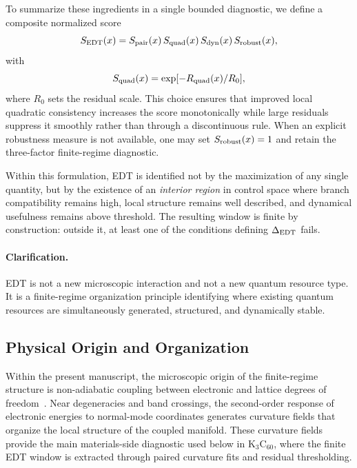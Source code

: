 ﻿\documentclass[aps,prx,reprint,superscriptaddress,longbibliography,floatfix]{revtex4-2}
\begin{document}
To summarize these ingredients in a single bounded diagnostic, we define a composite normalized score
\begin{equation}
S_{\rm EDT}(x) = S_{\rm pair}(x)\,S_{\rm quad}(x)\,S_{\rm dyn}(x)\,S_{\rm robust}(x),
\end{equation}
with
\begin{equation}
S_{\rm quad}(x) = \exp[-R_{\rm quad}(x)/R_0],
\end{equation}
where $R_0$ sets the residual scale. This choice ensures that improved local quadratic consistency increases the score monotonically while large residuals suppress it smoothly rather than through a discontinuous rule. When an explicit robustness measure is not available, one may set $S_{\rm robust}(x)=1$ and retain the three-factor finite-regime diagnostic.

Within this formulation, EDT is identified not by the maximization of any single quantity, but by the existence of an \emph{interior region} in control space where branch compatibility remains high, local structure remains well described, and dynamical usefulness remains above threshold. The resulting window is finite by construction: outside it, at least one of the conditions defining $\Delta_{\rm EDT}$ fails.

\paragraph*{Clarification.}

EDT is not a new microscopic interaction and not a new quantum resource type. It is a finite-regime organization principle identifying where existing quantum resources are simultaneously generated, structured, and dynamically stable.

\subsection{Physical Origin and Organization}

Within the present manuscript, the microscopic origin of the finite-regime structure is non-adiabatic coupling between electronic and lattice degrees of freedom~\cite{Mead1979,Yarkony1996,Giustino2017}. Near degeneracies and band crossings, the second-order response of electronic energies to normal-mode coordinates generates curvature fields that organize the local structure of the coupled manifold. These curvature fields provide the main materials-side diagnostic used below in K$_3$C$_{60}$, where the finite EDT window is extracted through paired curvature fits and residual thresholding.
\end{document}
